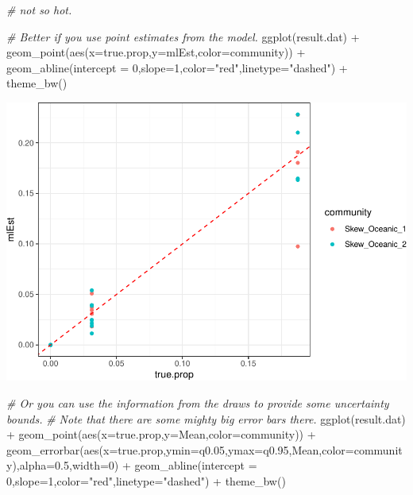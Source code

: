 \documentclass[
]{article}
\newenvironment{Shaded}{\begin{snugshade}}{\end{snugshade}}
\newcommand{\AttributeTok}[1]{\textcolor[rgb]{0.77,0.63,0.00}{#1}}
\newcommand{\CommentTok}[1]{\textcolor[rgb]{0.56,0.35,0.01}{\textit{#1}}}
\newcommand{\DecValTok}[1]{\textcolor[rgb]{0.00,0.00,0.81}{#1}}
\newcommand{\FloatTok}[1]{\textcolor[rgb]{0.00,0.00,0.81}{#1}}
\newcommand{\FunctionTok}[1]{\textcolor[rgb]{0.00,0.00,0.00}{#1}}
\newcommand{\NormalTok}[1]{#1}
\newcommand{\SpecialCharTok}[1]{\textcolor[rgb]{0.00,0.00,0.00}{#1}}
\newcommand{\StringTok}[1]{\textcolor[rgb]{0.31,0.60,0.02}{#1}}
\begin{document}
\begin{Shaded}
\begin{Highlighting}[]
\CommentTok{\# not so hot.}

\CommentTok{\# Better if you use point estimates from the model.}
\FunctionTok{ggplot}\NormalTok{(result.dat) }\SpecialCharTok{+}
    \FunctionTok{geom\_point}\NormalTok{(}\FunctionTok{aes}\NormalTok{(}\AttributeTok{x=}\NormalTok{true.prop,}\AttributeTok{y=}\NormalTok{mlEst,}\AttributeTok{color=}\NormalTok{community)) }\SpecialCharTok{+}
    \FunctionTok{geom\_abline}\NormalTok{(}\AttributeTok{intercept =} \DecValTok{0}\NormalTok{,}\AttributeTok{slope=}\DecValTok{1}\NormalTok{,}\AttributeTok{color=}\StringTok{"red"}\NormalTok{,}\AttributeTok{linetype=}\StringTok{"dashed"}\NormalTok{) }\SpecialCharTok{+}
    \FunctionTok{theme\_bw}\NormalTok{()}
\end{Highlighting}
\end{Shaded}

\includegraphics{Appendix-S4_files/figure-latex/stan_plots-2.pdf}

\begin{Shaded}
\begin{Highlighting}[]
\CommentTok{\# Or you can use the information from the draws to provide some uncertainty bounds.}
\CommentTok{\# Note that there are some mighty big error bars there.}
\FunctionTok{ggplot}\NormalTok{(result.dat) }\SpecialCharTok{+}
    \FunctionTok{geom\_point}\NormalTok{(}\FunctionTok{aes}\NormalTok{(}\AttributeTok{x=}\NormalTok{true.prop,}\AttributeTok{y=}\NormalTok{Mean,}\AttributeTok{color=}\NormalTok{community)) }\SpecialCharTok{+}
    \FunctionTok{geom\_errorbar}\NormalTok{(}\FunctionTok{aes}\NormalTok{(}\AttributeTok{x=}\NormalTok{true.prop,}\AttributeTok{ymin=}\NormalTok{q0}\FloatTok{.05}\NormalTok{,}\AttributeTok{ymax=}\NormalTok{q0}\FloatTok{.95}\NormalTok{,Mean,}\AttributeTok{color=}\NormalTok{community),}\AttributeTok{alpha=}\FloatTok{0.5}\NormalTok{,}\AttributeTok{width=}\DecValTok{0}\NormalTok{) }\SpecialCharTok{+}
    \FunctionTok{geom\_abline}\NormalTok{(}\AttributeTok{intercept =} \DecValTok{0}\NormalTok{,}\AttributeTok{slope=}\DecValTok{1}\NormalTok{,}\AttributeTok{color=}\StringTok{"red"}\NormalTok{,}\AttributeTok{linetype=}\StringTok{"dashed"}\NormalTok{) }\SpecialCharTok{+}
    \FunctionTok{theme\_bw}\NormalTok{()}
\end{Highlighting}
\end{Shaded}
\end{document}
